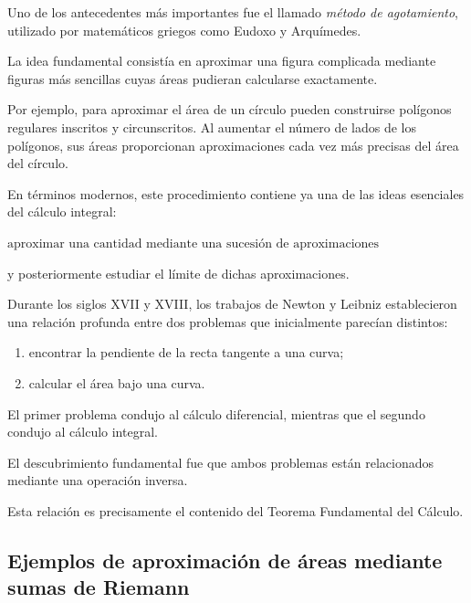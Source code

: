 \documentclass[12pt]{article}
\begin{document}
Uno de los antecedentes más importantes fue el llamado
\emph{método de agotamiento}, utilizado por matemáticos griegos como
Eudoxo y Arquímedes.

La idea fundamental consistía en aproximar una figura complicada mediante
figuras más sencillas cuyas áreas pudieran calcularse exactamente.

Por ejemplo, para aproximar el área de un círculo pueden construirse
polígonos regulares inscritos y circunscritos. Al aumentar el número de
lados de los polígonos, sus áreas proporcionan aproximaciones cada vez
más precisas del área del círculo.

En términos modernos, este procedimiento contiene ya una de las ideas
esenciales del cálculo integral:

$
\boxed{
\text{aproximar una cantidad mediante una sucesión de aproximaciones}
}
$

y posteriormente estudiar el límite de dichas aproximaciones.

Durante los siglos XVII y XVIII, los trabajos de Newton y Leibniz
establecieron una relación profunda entre dos problemas que inicialmente
parecían distintos:

\begin{enumerate}
    \item encontrar la pendiente de la recta tangente a una curva;
    \item calcular el área bajo una curva.
\end{enumerate}

El primer problema condujo al cálculo diferencial, mientras que el segundo
condujo al cálculo integral.

El descubrimiento fundamental fue que ambos problemas están relacionados
mediante una operación inversa.

Esta relación es precisamente el contenido del Teorema Fundamental del
Cálculo.

\subsection*{Ejemplos de aproximación de áreas mediante sumas de Riemann}
\end{document}
